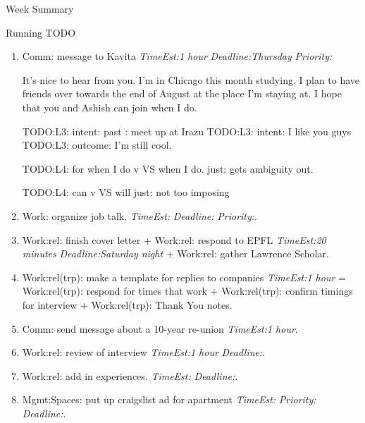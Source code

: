 \documentclass[serif, mathserif, final]{beamer}
\newcommand{\te}[1]{\textit{TimeEst:}\textit{#1}}
\newcommand{\dl}[1]{\textit{Deadline:}\textit{#1}}
\newcommand{\pr}[1]{\textit{Priority:}\textit{#1}}
\begin{document}
\begin{frame}
\begin{columns}
\begin{column}{0.5\linewidth}
\begin{block}{Week Summary}
\begin{block}{Running TODO}
\begin{enumerate}
       A unique aspect of the apartments in the building are the high
       cement ceilings and full-glass windows. The apartment has
       24-hour security, fitness center, lounge, and outdoor bb       area. 
       
       Water and gas is included in the rent. 


       \te{1 hour} \dl{Thursday} \pr{}. 

      \item \tiny Comm: message to Kavita  \te{1 hour} \dl{Thursday}
        \pr{} 

        It's nice to hear from you. I'm in Chicago this month
        studying. I plan to have friends over towards the end of
        August at the place I'm staying at. I hope that you and
        Ashish can join when I do.


        TODO:L3: intent: past : meet up at Irazu 
        TODO:L3: intent: I like you guys
        TODO:L3: outcome: I'm still cool. 

        TODO:L4: for when I do v VS when I do. just: gets ambiguity
        out. 
        
        TODO:L4: can v VS will  just: not too imposing  
 
      \item \tiny Work: organize job talk. \te{} \dl{} \pr{}.

      \item \tiny Work:rel: finish cover letter + Work:rel:
        respond to EPFL \te{20 minutes} \dl{Saturday night}  +
        Work:rel: gather Lawrence Scholar.
        
      \item \tiny Work:rel(trp): make a template for replies to
        companies \te{1 hour} = Work:rel(trp): respond for times that work + 
        Work:rel(trp): confirm timings for interview + Work:rel(trp):
        Thank You notes. 
        
      \item \tiny Comm: send message about a 10-year re-union \te{1 hour}. 
  
      \item \tiny Work:rel: review of interview \te{1 hour} \dl{}. 
     
      \item \tiny Work:rel: add in experiences. \te{} \dl{}. 
        
      \item \tiny Mgmt:Spaces: put up craigslist ad for apartment 
        \te{} \pr{} \dl{}. 
        

\end{enumerate}
\end{block}
\end{block}
\end{column}
\end{columns}
\end{frame}
\end{document}
